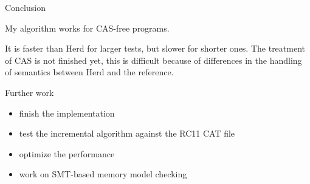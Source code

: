 \documentclass[dvipsnames,svgnames,beamer, 12pt]{beamer}
\begin{document}
\iffalse \begin{frame}{Differences between the reference and my implementation}

	Herd generates a set of events and constraints per possible path.
	
	Some partial executions get computed more than once.
	\vfill
	Some parts of the reference algorithm aren't relevant to herd.

\end{frame}\fi

\begin{frame}{Conclusion}

	My algorithm works for CAS-free programs.
	
	It is faster than Herd for larger tests, but slower for shorter ones.
	\vfill
	The treatment of CAS is not finished yet, this is difficult because of differences in the handling of semantics between Herd and the reference.
\end{frame}

\begin{frame}{Further work}

	\begin{itemize}
	\item finish the implementation
	\item test the incremental algorithm against the RC11 CAT file
	\item optimize the performance
	\item work on SMT-based memory model checking
	\end{itemize}

\end{frame}
\end{document}
